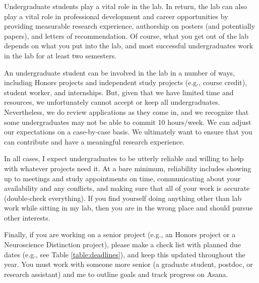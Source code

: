 \documentclass[letterpaper,11pt,oneside]{memoir}
\begin{document}
Undergraduate students play a vital role in the lab. In return, the lab can also play a vital role in professional development and career opportunities by providing measurable research experience, authorship on posters (and potentially papers), and letters of recommendation. Of course, what you get out of the lab depends on what you put into the lab, and most successful undergraduates work in the lab for at least two semesters. 

An undergraduate student can be involved in the lab in a number of ways, including Honors projects and independent study projects (e.g., course credit), student worker, and internships. But, given that we have limited time and resources, we unfortunately cannot accept or keep all undergraduates. Nevertheless, we do review applications as they come in, and we recognize that some undergraduates may not be able to commit 10 hours/week. We can adjust our expectations on a case-by-case basis. We ultimately want to ensure that you can contribute and have a meaningful research experience. 

In all cases, I expect undergraduates to be utterly reliable and willing to help with whatever projects need it. At a bare minimum, reliability includes showing up to meetings and study appointments on time, communicating about your availability and any conflicts, and making sure that all of your work is accurate (double-check everything). If you find yourself doing anything other than lab work while sitting in my lab, then you are in the wrong place and should pursue other interests.

Finally, if you are working on a senior project (e.g., an Honors project or a Neuroscience Distinction project), please make a check list with planned due dates (e.g., see Table \ref{table:deadlines}), and keep this updated throughout the year. You must work with someone more senior (a graduate student, postdoc, or research assistant) and me to outline goals and track progress on Asana.
\end{document}
